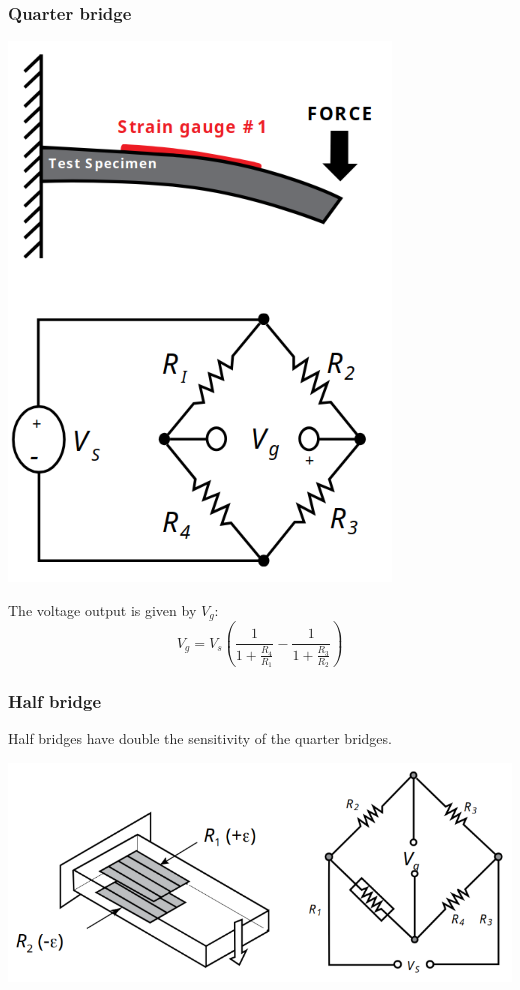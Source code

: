 \documentclass[11pt]{article}
\begin{document}
\subsubsection{Quarter bridge}
\label{sec:org8819704}
\begin{center}
\includegraphics[width=.9\linewidth]{./images/quarter-bridge-deflection-bridge.png}
\end{center}

The voltage output is given by \(V_g\):
\[V_g = V_s \left(\frac{1}{1 + \frac{R_4}{R_1}} - \frac{1}{1 + \frac{R_3}{R_2}} \right)\]
\subsubsection{Half bridge}
\label{sec:org78718cb}
Half bridges have double the sensitivity of the quarter bridges.
\begin{center}
\includegraphics[width=.9\linewidth]{./images/half-bridge-deflection-bridge.png}
\end{center}
\end{document}
